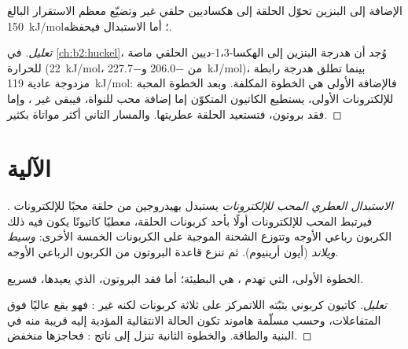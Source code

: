 \begin{proposition}\label{prop:b2:aromatic-substitution:no-addition}
الإضافة إلى البنزين تحوّل الحلقة  إلى هكساديين حلقي غير  
وتضيّع معظم الاستقرار  البالغ \qty{150}{kJ/mol}؛ أما الاستبدال فيحفظه.
\end{proposition}

\begin{proof}[تعليل]
في \cref{ch:b2:huckel}، وُجد أن هدرجة البنزين إلى الهكسا-1،3-ديين الحلقي
ماصة للحرارة (\qty{+22}{kJ/mol}، من \qty{-206.0}{} و\qty{-227.7}{kJ/mol})، بينما تطلق هدرجة
رابطة مزدوجة عادية \qty{119}{kJ/mol}: فالإضافة الأولى هي الخطوة المكلفة.
وبعد الخطوة المحبة للإلكترونات الأولى، يستطيع الكاتيون المتكوّن إما إضافة محب للنواة، فيبقى
 غير ، وإما فقد بروتون، فتستعيد الحلقة عطريتها. والمسار الثاني
أكثر مواتاة بكثير.
\end{proof}

\section{الآلية}

\begin{definition}\label{def:b2:aromatic-substitution:seAr}
\emph{الاستبدال العطري المحب للإلكترونات}
يستبدل بهيدروجين من حلقة  محبًا للإلكترونات . فيرتبط المحب للإلكترونات أولًا
بأحد كربونات الحلقة، معطيًا كاتيونًا يكون فيه ذلك الكربون رباعي الأوجه 
وتتوزع الشحنة الموجبة على الكربونات الخمسة الأخرى: \emph{وسيط ويلاند}
(أيون أرينيوم). ثم تنزع قاعدة البروتون من الكربون الرباعي الأوجه.
\end{definition}

\begin{proposition}[خطوتان]\label{prop:b2:aromatic-substitution:mechanism}
الخطوة الأولى، التي تهدم ، هي البطيئة؛ أما فقد البروتون،
الذي يعيدها، فسريع.
\end{proposition}

\begin{proof}[تعليل]
 كاتيون كربوني يثبّته اللاتمركز على ثلاثة كربونات
لكنه غير : فهو يقع عاليًا فوق المتفاعلات، وحسب مسلّمة هاموند تكون
الحالة الانتقالية المؤدية إليه قريبة منه في البنية والطاقة. والخطوة الثانية
تنزل إلى ناتج : فحاجزها منخفض.
\end{proof}

